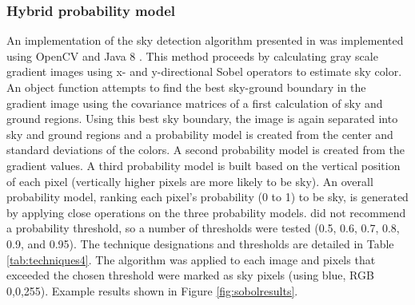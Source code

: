 \documentclass[final,3p,times,authoryear]{elsarticle}
\begin{document}
\subsubsection{Hybrid probability model}\label{sec:prob}
An implementation of the sky detection algorithm presented in \cite{Wang2015a} was implemented using OpenCV \citep{Bradski2000} and Java 8 \citep{Oracle2018}. This method proceeds by calculating gray scale gradient images using x- and y-directional Sobel operators to estimate sky color. An object function attempts to find the best sky-ground boundary in the gradient image using the covariance matrices of a first calculation of sky and ground regions. Using this best sky boundary, the image is again separated into sky and ground regions and a probability model is created from the center and standard deviations of the colors. A second probability model is created from the gradient values. A third probability model is built based on the vertical position of each pixel (vertically higher pixels are more likely to be sky). An overall probability model, ranking each pixel's probability (0 to 1) to be sky, is generated by applying close operations on the three probability models. \cite{Wang2015a} did not recommend a probability threshold, so a number of thresholds were tested (0.5, 0.6, 0.7, 0.8, 0.9, and 0.95). The technique designations and thresholds are detailed in Table \ref{tab:techniques4}. The algorithm was applied to each image and pixels that exceeded the chosen threshold were marked as sky pixels (using blue, RGB 0,0,255). Example results shown in Figure \ref{fig:sobolresults}.
\end{document}
